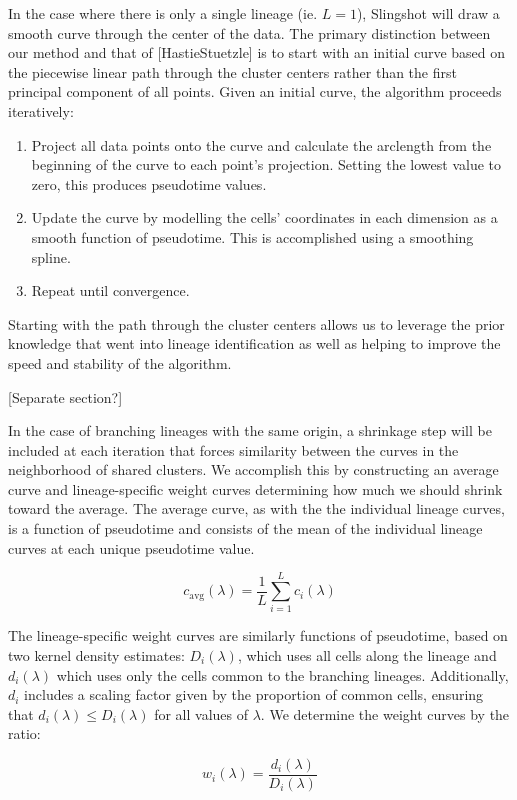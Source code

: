 \documentclass[11pt]{article}\usepackage[]{graphicx}\usepackage[]{color}
\begin{document}
In the case where there is only a single lineage (ie. $L = 1$), Slingshot will draw a smooth curve through the center of the data. The primary distinction between our method and that of [HastieStuetzle] is to start with an initial curve based on the piecewise linear path through the cluster centers rather than the first principal component of all points. Given an initial curve, the algorithm proceeds iteratively:
\begin{enumerate}[font={\bfseries}]
\item Project all data points onto the curve and calculate the arclength from the beginning of the curve to each point's projection. Setting the lowest value to zero, this produces pseudotime values.
\item Update the curve by modelling the cells' coordinates in each dimension as a smooth function of pseudotime. This is accomplished using a smoothing spline.
\item Repeat until convergence.
\end{enumerate}
Starting with the path through the cluster centers allows us to leverage the prior knowledge that went into lineage identification as well as helping to improve the speed and stability of the algorithm.

[Separate section?]

In the case of branching lineages with the same origin, a shrinkage step will be included at each iteration that forces similarity between the curves in the neighborhood of shared clusters. We accomplish this by constructing an average curve and lineage-specific weight curves determining how much we should shrink toward the average. The average curve, as with the the individual lineage curves, is a function of pseudotime and consists of the mean of the individual lineage curves at each unique pseudotime value.

$$c_{\text{avg}}(\lambda) = \frac{1}{L}\sum_{i=1}^{L}{c_i(\lambda)}$$

The lineage-specific weight curves are similarly functions of pseudotime, based on two kernel density estimates: $D_i(\lambda)$, which uses all cells along the lineage and $d_i(\lambda)$ which uses only the cells common to the branching lineages. Additionally, $d_i$ includes a scaling factor given by the proportion of common cells, ensuring that $d_i(\lambda) \leq D_i(\lambda)$ for all values of $\lambda$. We determine the weight curves by the ratio:

$$w_i(\lambda) = \frac{d_i(\lambda)}{D_i(\lambda)}$$
\end{document}
